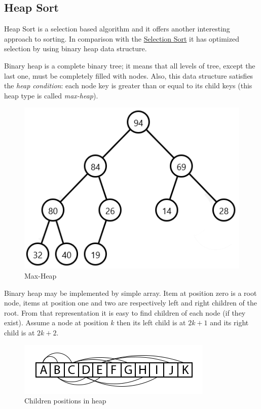 \documentclass[
  field=inf,
  biblatex,
  language=english,
  glossaries,
  index
]{kidiplom}
\begin{document}
\subsection{Heap Sort}

Heap Sort is a selection based algorithm and it offers another interesting approach to sorting. In comparison with the \hyperref[sec:selection]{Selection Sort} it has optimized selection by using binary heap data structure. 

Binary heap is a complete binary tree; it means that all levels of tree, except the last one, must be completely filled with nodes. Also, this data structure satisfies the \textit{heap condition}: each node key is greater than or equal to its child keys (this heap type is called \textit{max-heap}).

\begin{figure}[H]
\begin{center}
	
	\includegraphics[scale=0.7]{img/Maxheap.png}
	\caption{Max-Heap}\label{fig:maxheap}
\end{center}
\end{figure}

Binary heap may be implemented by simple array. Item at position zero is a root node, items at position one and two are respectively left and right children of the root. From that representation it is easy to find children of each node (if they exist). Assume a node at position $k$ then its left child is at $2k + 1$ and its right child is at $2k + 2$.

\begin{figure}[H]
\begin{center}
	
	\includegraphics[scale=3]{img/Heapsort.png}
	\caption{Children positions in heap}\label{fig:heapsort}
\end{center}
\end{figure}
\end{document}
